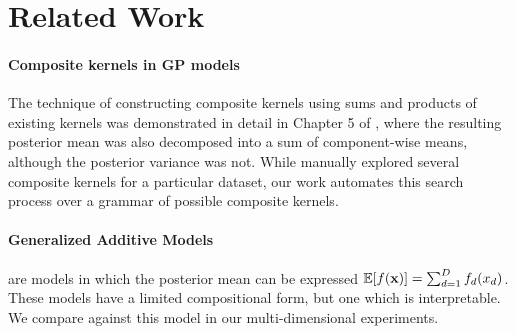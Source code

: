 \documentclass[twoside]{article}
\begin{document}






\section{Related Work}
\label{sec:related_work}

\paragraph{Composite kernels in GP models} The technique of constructing composite kernels using sums and products of existing kernels was demonstrated in detail in Chapter 5 of \cite{rasmussen38gaussian}, where the resulting posterior mean was also decomposed into a sum of component-wise means, although the posterior variance was not.  While \cite{rasmussen38gaussian} manually explored several composite kernels for a particular dataset, our work automates this search process over a grammar of possible composite kernels.

\paragraph{Generalized Additive Models} \cite{hastie1990generalized} are models in which the posterior mean can be expressed $\mathbb{E}[f({\bf{x}})] = \sum_{d=1}^D f_d(x_d)$. These models have a limited compositional form, but one which is interpretable.  We compare against this model in our multi-dimensional experiments.
\end{document}
